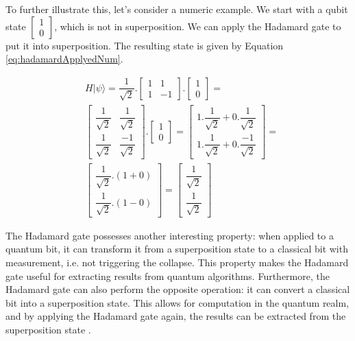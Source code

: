 			\par To further illustrate this, let's consider a numeric example. We start with a qubit state $\begin{bmatrix} 1 \\ 0 \end{bmatrix}$, which is not in superposition. We can apply the Hadamard gate to put it into superposition. The resulting state is given by Equation \ref{eq:hadamardApplyedNum}.
			
			\begin{equation}
				\label{eq:hadamardApplyedNum}
				\begin{aligned}
					&H|\psi\rangle = \dfrac{1}{\sqrt{2}}.\begin{bmatrix}
						1& 1 \\
						1& -1
					\end{bmatrix} . \begin{bmatrix}
						1 \\
						0
					\end{bmatrix} = \\
					&\begin{bmatrix}
						\dfrac{1}{\sqrt{2}} &\dfrac{1}{\sqrt{2}} \\
						\dfrac{1}{\sqrt{2}} &\dfrac{-1}{\sqrt{2}}
					\end{bmatrix} .
					\begin{bmatrix}
						1 \\
						0
					\end{bmatrix} = 
					\begin{bmatrix}
						1 . \dfrac{1}{\sqrt{2}} + 0.\dfrac{1}{\sqrt{2}} \\
						1 . \dfrac{1}{\sqrt{2}} + 0.\dfrac{-1}{\sqrt{2}}
					\end{bmatrix} = \\
					&\begin{bmatrix}
						\dfrac{1}{\sqrt{2}} . (1 + 0) \\
						\dfrac{1}{\sqrt{2}} . (1 - 0)
					\end{bmatrix} = 
					\begin{bmatrix}
						\dfrac{1}{\sqrt{2}} \\
						\dfrac{1}{\sqrt{2}}
					\end{bmatrix}
				\end{aligned}
			\end{equation}
			
			\par The Hadamard gate possesses another interesting property: when applied to a quantum bit, it can transform it from a superposition state to a classical bit with measurement, i.e. not triggering the collapse. This property makes the Hadamard gate useful for extracting results from quantum algorithms. Furthermore, the Hadamard gate can also perform the opposite operation: it can convert a classical bit into a superposition state. This allows for computation in the quantum realm, and by applying the Hadamard gate again, the results can be extracted from the superposition state \cite{qcfcs}.\newline

